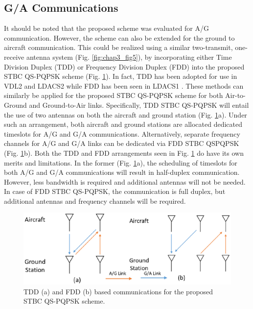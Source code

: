 \subsection{G/A Communications}
It should be noted that the proposed scheme was evaluated for A/G communication. However, the scheme can also be extended for the ground to aircraft communication. This could be realized using a similar two-transmit, one-receive antenna system (Fig. \ref{fig:chap3_fig5}), by incorporating either Time Division Duplex (TDD) or Frequency Division Duplex (FDD) into the proposed STBC QS-PQPSK scheme (Fig. \ref{fig:chap3_fig7}). In fact, TDD has been adopted for use in VDL2 \cite{stacey2008aeronautical} and LDACS2 \cite{neji2013survey} while FDD has been seen in LDACS1 \cite{neji2013survey}. These methods can similarly be applied for the proposed STBC QS-PQPSK scheme for both Air-to-Ground and Ground-to-Air links. Specifically, TDD STBC QS-PQPSK will entail the use of two antennas on both the aircraft and ground station (Fig. \ref{fig:chap3_fig7}a). Under such an arrangement, both aircraft and ground stations are allocated dedicated timeslots for A/G and G/A communications. Alternatively, separate frequency channels for A/G and G/A links can be dedicated via FDD STBC QSPQPSK (Fig. \ref{fig:chap3_fig7}b). Both the TDD and FDD arrangements seen in Fig. \ref{fig:chap3_fig7} do have its own merits and limitations. In the former (Fig. \ref{fig:chap3_fig7}a), the scheduling of timeslots for both A/G and G/A communications will result in half-duplex communication. However, less bandwidth is required and additional antennas will not be needed. In case of FDD STBC QS-PQPSK, the
communication is full duplex, but additional antennas and frequency channels will be required.

\begin{figure} []
\centering
\vspace{-1.0in}
\includegraphics [width=1\columnwidth]{chap3_fig/chap3_fig7.eps} 
\vspace{-2.5in}
\caption{TDD (a) and FDD (b) based communications for the proposed
STBC QS-PQPSK scheme.}
\label{fig:chap3_fig7}
\end{figure}



